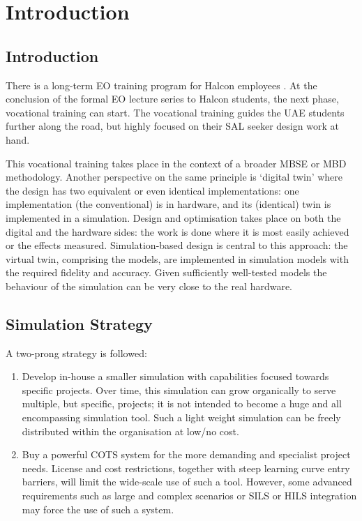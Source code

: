 
\chapter{Introduction}
\label{chap:Introduction}


\section{Introduction}

There is a long-term \ac{EO} training program for Halcon employees \cite{willershalcontraining2021}.
At the conclusion of the formal \ac{EO} lecture series to Halcon students, the next phase, vocational training can start.
The vocational training guides the \ac{UAE} students further along the road, but highly focused on their \ac{SAL} seeker design work at hand.

This vocational training takes place in the context of a broader \ac{MBSE} or \ac{MBD} methodology.  Another perspective on the same principle is `digital twin' where the design has two equivalent or even identical implementations: one implementation (the conventional) is in hardware, and its (identical) twin is implemented in a simulation.  Design and optimisation takes place on both the digital and the hardware sides: the work is done where it is most easily achieved or the effects measured.  
Simulation-based design is central to this approach: the virtual twin, comprising the models, are implemented in simulation models with the required fidelity and accuracy. Given sufficiently well-tested models the behaviour of the simulation can be very close to the real hardware.



\section{Simulation Strategy}

A two-prong strategy is followed:
\begin{enumerate}
    \item Develop in-house a smaller simulation with capabilities focused towards specific projects. Over time, this simulation can grow organically to serve multiple, but specific, projects; it is not intended to become a huge and all encompassing simulation tool.  Such  a light weight simulation can be freely distributed within the organisation at low/no cost.
    \item Buy a powerful \ac{COTS} system for the more demanding and specialist project needs.  License and  cost restrictions, together with steep learning curve entry barriers,  will limit the wide-scale use of such a tool.  However, some advanced requirements such as large and complex scenarios or \ac{SILS} or \ac{HILS} integration may force the use of such a system.
\end{enumerate}

